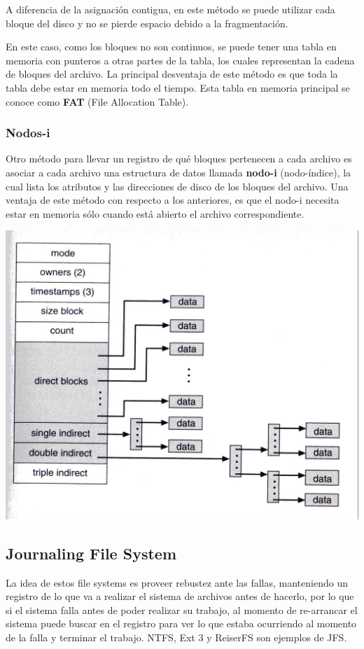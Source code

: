 A diferencia de la asignación contigua, en este método se puede utilizar cada bloque del disco y no se pierde espacio debido a la fragmentación.

En este caso, como los bloques no son continuos, se puede tener una tabla en memoria con punteros a otras partes de la tabla, los cuales representan la cadena de bloques del archivo. La principal desventaja de este método es que toda la tabla debe estar en memoria todo el tiempo. Esta tabla en memoria principal se conoce como \textbf{FAT} (File Allocation Table).

\subsubsection{Nodos-i}

Otro método para llevar un registro de qué bloques pertenecen a cada archivo es asociar a cada archivo una estructura de datos llamada \textbf{nodo-i} (nodo-índice), la cual lista los atributos y las direcciones de disco de los bloques del archivo. Una ventaja de este método con respecto a los anteriores, es que el nodo-i necesita estar en memoria sólo cuando está abierto el archivo correspondiente.

\includegraphics[scale=1]{imagenes/inode.jpg} 


\subsection{Journaling File System}

La idea de estos file systems es proveer rebustez ante las fallas, manteniendo un registro de lo que va a realizar el sistema de archivos antes de hacerlo, por lo que si el sistema falla antes de poder realizar su trabajo, al momento de re-arrancar el sistema puede buscar en el registro para ver lo que estaba ocurriendo al momento de la falla y terminar el trabajo. NTFS, Ext 3 y ReiserFS son ejemplos de JFS.

